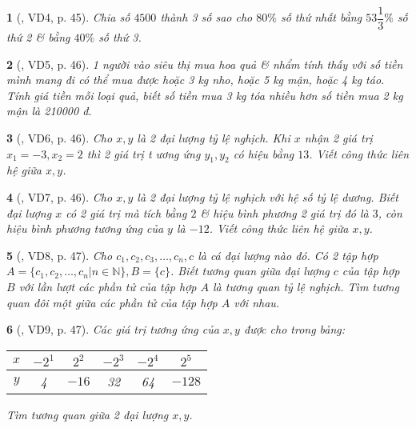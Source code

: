 \documentclass{article}
\newtheorem{baitoan}{}
\begin{document}
\begin{baitoan}[\cite{Binh_boi_duong_Toan_7_tap_1}, VD4, p. 45]
	Chia số $4500$ thành 3 số sao cho $80\%$ số thứ nhất bằng $53\dfrac{1}{3}\%$ số thứ 2 \& bằng $40\%$ số thứ 3.
\end{baitoan}

\begin{baitoan}[\cite{Binh_boi_duong_Toan_7_tap_1}, VD5, p. 46]
	1 người vào siêu thị mua hoa quả \& nhẩm tính thấy với số tiền mình mang đi có thể mua được hoặc {\rm3 kg} nho, hoặc {\rm5 kg} mận, hoặc {\rm4 kg} táo. Tính giá tiền mỗi loại quả, biết số tiền mua {\rm3 kg} tóa nhiều hơn số tiền mua {\rm2 kg} mận là {\rm210000 đ}.
\end{baitoan}

\begin{baitoan}[\cite{Binh_boi_duong_Toan_7_tap_1}, VD6, p. 46]
	Cho $x,y$ là 2 đại lượng tỷ lệ nghịch. Khi $x$ nhận 2 giá trị $x_1 = -3,x_2 = 2$ thì 2 giá trị t ương ứng $y_1,y_2$ có hiệu bằng $13$. Viết công thức liên hệ giữa $x,y$.
\end{baitoan}

\begin{baitoan}[\cite{Binh_boi_duong_Toan_7_tap_1}, VD7, p. 46]
	Cho $x,y$ là 2 đại lượng tỷ lệ nghịch với hệ số tỷ lệ dương. Biết đại lượng $x$ có 2 giá trị mà tích bằng $2$ \& hiệu bình phương 2 giá trị đó là $3$, còn hiệu bình phương tương ứng của $y$ là $-12$. Viết công thức liên hệ giữa $x,y$.
\end{baitoan}

\begin{baitoan}[\cite{Binh_boi_duong_Toan_7_tap_1}, VD8, p. 47]
	Cho $c_1,c_2,c_3,\ldots,c_n,c$ là cá đại lượng nào đó. Có 2 tập hợp $A = \{c_1,c_2,\ldots,c_n|n\in\mathbb{N}\},B = \{c\}$. Biết tương quan giữa đại lượng $c$ của tập hợp $B$ với lần lượt các phần tử của tập hợp $A$ là tương quan tỷ lệ nghịch. Tìm tương quan đôi một giữa các phần tử của tập hợp $A$ với nhau.
\end{baitoan}

\begin{baitoan}[\cite{Binh_boi_duong_Toan_7_tap_1}, VD9, p. 47]
	Các giá trị tương ứng của $x,y$ được cho trong bảng:
	\begin{table}[H]
		\centering
		\begin{tabular}{|c|c|c|c|c|c|}
			\hline
			$x$ & $-2^1$ & $2^2$ & $-2^3$ & $-2^4$ & $2^5$ \\
			\hline
			$y$ & 4 & $-16$ & 32 & 64 & $-128$ \\
			\hline
		\end{tabular}
	\end{table}
	\noindent Tìm tương quan giữa 2 đại lượng $x,y$.
\end{baitoan}
\end{document}
